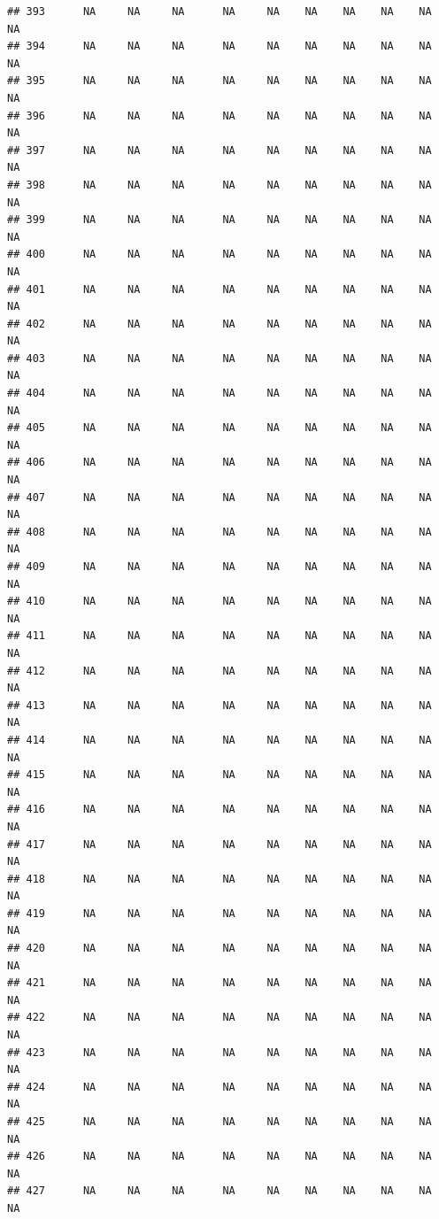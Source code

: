 \documentclass{article}\usepackage{graphicx, color}
\makeatletter
\newenvironment{kframe}{%
 \def\at@end@of@kframe{}%
 \ifinner\ifhmode%
  \def\at@end@of@kframe{\end{minipage}}%
  \begin{minipage}{\columnwidth}%
 \fi\fi%
 \def\FrameCommand##1{\hskip\@totalleftmargin \hskip-\fboxsep
 \colorbox{shadecolor}{##1}\hskip-\fboxsep
     \hskip-\linewidth \hskip-\@totalleftmargin \hskip\columnwidth}%
 \MakeFramed {\advance\hsize-\width
   \@totalleftmargin\z@ \linewidth\hsize
   \@setminipage}}%
 {\par\unskip\endMakeFramed%
 \at@end@of@kframe}
\newenvironment{knitrout}{}{} %
\makeatother
\begin{document}
\begin{knitrout}
\begin{kframe}
\begin{verbatim}
## 393      NA     NA     NA      NA     NA    NA    NA    NA    NA     NA
## 394      NA     NA     NA      NA     NA    NA    NA    NA    NA     NA
## 395      NA     NA     NA      NA     NA    NA    NA    NA    NA     NA
## 396      NA     NA     NA      NA     NA    NA    NA    NA    NA     NA
## 397      NA     NA     NA      NA     NA    NA    NA    NA    NA     NA
## 398      NA     NA     NA      NA     NA    NA    NA    NA    NA     NA
## 399      NA     NA     NA      NA     NA    NA    NA    NA    NA     NA
## 400      NA     NA     NA      NA     NA    NA    NA    NA    NA     NA
## 401      NA     NA     NA      NA     NA    NA    NA    NA    NA     NA
## 402      NA     NA     NA      NA     NA    NA    NA    NA    NA     NA
## 403      NA     NA     NA      NA     NA    NA    NA    NA    NA     NA
## 404      NA     NA     NA      NA     NA    NA    NA    NA    NA     NA
## 405      NA     NA     NA      NA     NA    NA    NA    NA    NA     NA
## 406      NA     NA     NA      NA     NA    NA    NA    NA    NA     NA
## 407      NA     NA     NA      NA     NA    NA    NA    NA    NA     NA
## 408      NA     NA     NA      NA     NA    NA    NA    NA    NA     NA
## 409      NA     NA     NA      NA     NA    NA    NA    NA    NA     NA
## 410      NA     NA     NA      NA     NA    NA    NA    NA    NA     NA
## 411      NA     NA     NA      NA     NA    NA    NA    NA    NA     NA
## 412      NA     NA     NA      NA     NA    NA    NA    NA    NA     NA
## 413      NA     NA     NA      NA     NA    NA    NA    NA    NA     NA
## 414      NA     NA     NA      NA     NA    NA    NA    NA    NA     NA
## 415      NA     NA     NA      NA     NA    NA    NA    NA    NA     NA
## 416      NA     NA     NA      NA     NA    NA    NA    NA    NA     NA
## 417      NA     NA     NA      NA     NA    NA    NA    NA    NA     NA
## 418      NA     NA     NA      NA     NA    NA    NA    NA    NA     NA
## 419      NA     NA     NA      NA     NA    NA    NA    NA    NA     NA
## 420      NA     NA     NA      NA     NA    NA    NA    NA    NA     NA
## 421      NA     NA     NA      NA     NA    NA    NA    NA    NA     NA
## 422      NA     NA     NA      NA     NA    NA    NA    NA    NA     NA
## 423      NA     NA     NA      NA     NA    NA    NA    NA    NA     NA
## 424      NA     NA     NA      NA     NA    NA    NA    NA    NA     NA
## 425      NA     NA     NA      NA     NA    NA    NA    NA    NA     NA
## 426      NA     NA     NA      NA     NA    NA    NA    NA    NA     NA
## 427      NA     NA     NA      NA     NA    NA    NA    NA    NA     NA

\end{verbatim}
\end{kframe}
\end{knitrout}
\end{document}

